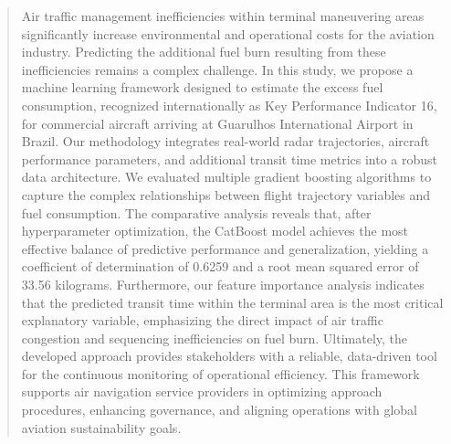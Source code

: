 \begin{abstract}
Air traffic management inefficiencies within terminal maneuvering areas significantly increase environmental and operational costs for the aviation industry. Predicting the additional fuel burn resulting from these inefficiencies remains a complex challenge. In this study, we propose a machine learning framework designed to estimate the excess fuel consumption, recognized internationally as Key Performance Indicator 16, for commercial aircraft arriving at Guarulhos International Airport in Brazil. Our methodology integrates real-world radar trajectories, aircraft performance parameters, and additional transit time metrics into a robust data architecture. We evaluated multiple gradient boosting algorithms to capture the complex relationships between flight trajectory variables and fuel consumption. The comparative analysis reveals that, after hyperparameter optimization, the CatBoost model achieves the most effective balance of predictive performance and generalization, yielding a coefficient of determination of 0.6259 and a root mean squared error of 33.56 kilograms. Furthermore, our feature importance analysis indicates that the predicted transit time within the terminal area is the most critical explanatory variable, emphasizing the direct impact of air traffic congestion and sequencing inefficiencies on fuel burn. Ultimately, the developed approach provides stakeholders with a reliable, data-driven tool for the continuous monitoring of operational efficiency. This framework supports air navigation service providers in optimizing approach procedures, enhancing governance, and aligning operations with global aviation sustainability goals.
\end{abstract}